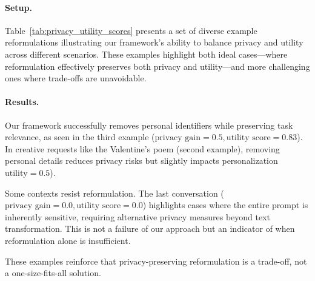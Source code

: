 \paragraph{Setup.} Table~\ref{tab:privacy_utility_scores} presents a set of diverse example reformulations illustrating our framework’s ability to balance privacy and utility across different scenarios. These examples highlight both ideal cases—where reformulation effectively preserves both privacy and utility—and more challenging ones where trade-offs are unavoidable.

\paragraph{Results.} Our framework successfully removes personal identifiers while preserving task relevance, as seen in the third example ($\text{privacy gain} = 0.5,\text{utility score}= 0.83$). In creative requests like the Valentine’s poem (second example), removing personal details reduces privacy risks but slightly impacts personalization $\text{utility}=0.5$).

Some contexts resist reformulation. The last conversation ($\text{privacy gain}= 0.0, \text{utility score}= 0.0$) highlights cases where the entire prompt is inherently sensitive, requiring alternative privacy measures beyond text transformation. This is not a failure of our approach but an indicator of when reformulation alone is insufficient.

These examples reinforce that privacy-preserving reformulation is a trade-off, not a one-size-fits-all solution.

    




